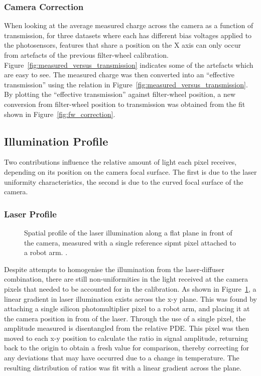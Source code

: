 \subsubsection{Camera Correction}

When looking at the average measured charge across the camera as a function of transmission, for three datasets where each has different bias voltages applied to the photosensors, features that share a position on the X axis can only occur from artefacts of the previous filter-wheel calibration. Figure~\ref{fig:measured_versus_transmission} indicates some of the artefacts which are easy to see. The measured charge was then converted into an ``effective transmission'' using the relation in Figure~\ref{fig:measured_versus_transmission}. By plotting the ``effective transmission'' against filter-wheel position, a new conversion from filter-wheel position to transmission was obtained from the fit shown in Figure~\ref{fig:fw_correction}.

\subsection{Illumination Profile} \label{section:illumination_profile}

Two contributions influence the relative amount of light each pixel receives, depending on its position on the camera focal surface. The first is due to the laser uniformity characteristics, the second is due to the curved focal surface of the camera.

\subsubsection{Laser Profile}

\begin{figure}
	\centering
	\caption[Lab laser profile]{Spatial profile of the laser illumination along a flat plane in front of the camera, measured with a single reference \gls{sipmt} pixel attached to a robot arm. .}
	\label{fig:light_profile}
\end{figure}

Despite attempts to homogenise the illumination from the laser-diffuser combination, there are still non-uniformities in the light received at the camera pixels that needed to be accounted for in the calibration. As shown in Figure~\ref{fig:light_profile}, a linear gradient in laser illumination exists across the x-y plane. This was found by attaching a single silicon photomultiplier pixel to a robot arm, and placing it at the camera position in from of the laser. Through the use of a single pixel, the amplitude measured is disentangled from the relative PDE. This pixel was then moved to each x-y position to calculate the ratio in signal amplitude, returning back to the origin to obtain a fresh value for comparison, thereby correcting for any deviations that may have occurred due to a change in temperature. The resulting distribution of ratios was fit with a linear gradient across the plane.

